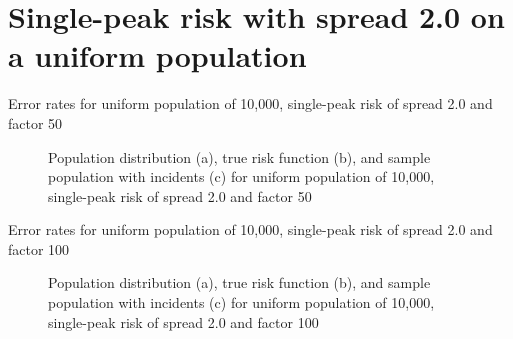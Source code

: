  
 
\section{Single-peak risk with spread 2.0 on a uniform population}
\label{sec:app:results_unif_2.0_1h}

\graphicspath{{./results/unif_50_2.0_1h/}}
\makeatletter
{}
\makeatother

\begin{table}[H]
    
    \caption[]{Error rates for uniform population of 10,000, single-peak risk of \gls{spread} 2.0 and \gls{factor} 50}
    \label{tab:mean_error_rates:unif_50_2.0_1h}
\end{table}

\begin{figure}[H]
    
    \caption[]{Population distribution (a), true risk function (b), and sample population with incidents (c) for uniform population of 10,000, single-peak risk of \gls{spread} 2.0 and \gls{factor} 50}
    \label{fig:distributions:unif_50_2.0_1h}    
\end{figure}


\graphicspath{{./results/unif_100_2.0_1h/}}
\makeatletter
{}
\makeatother

\begin{table}[H]

\caption[]{Error rates for uniform population of 10,000, single-peak risk of \gls{spread} 2.0 and \gls{factor} 100}
\label{tab:mean_error_rates:unif_100_2.0_1h}
\end{table}

\begin{figure}[H]
    
    \caption[]{Population distribution (a), true risk function (b), and sample population with incidents (c) for uniform population of 10,000, single-peak risk of \gls{spread} 2.0 and \gls{factor} 100}
    \label{fig:distributions:unif_100_2.0_1h}    
\end{figure}


\graphicspath{{./results/unif_200_2.0_1h/}}
\makeatletter
{}
\makeatother

